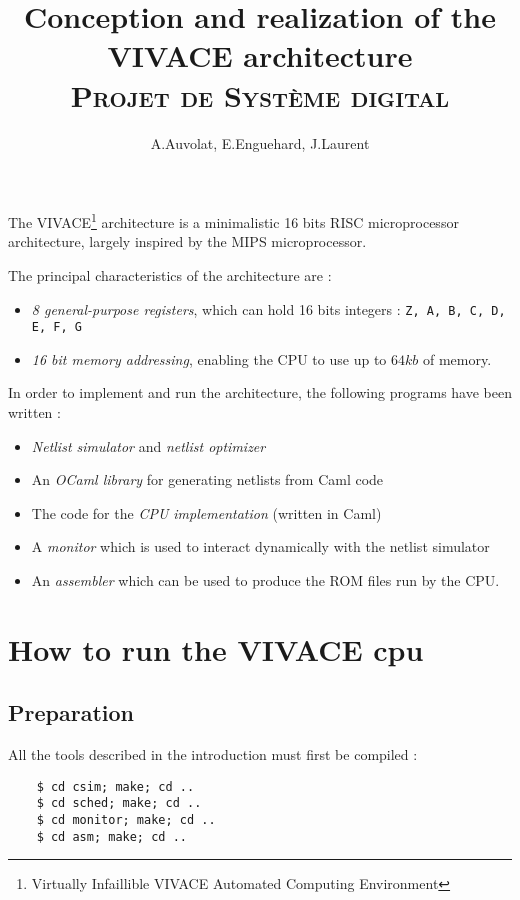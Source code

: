 \documentclass[11pt, a4paper]{article}
\newcommand{\prog}[1]{{\tt#1}}
\begin{document}
\title{Conception and realization of the VIVACE architecture
             \\ \normalsize{\textsc{Projet de Système digital}}}
\author{A.Auvolat, E.Enguehard, J.Laurent}
\maketitle


The VIVACE\footnote{Virtually Infaillible VIVACE Automated Computing Environment} architecture is
a minimalistic 16 bits RISC microprocessor architecture, largely inspired by the MIPS
microprocessor.


The principal characteristics of the architecture are :

\begin{itemize}
\item \textit{8 general-purpose registers}, which can hold 16 bits integers : \prog{Z, A, B, C, D, E, F, G}
\item \textit{16 bit memory addressing}, enabling the CPU to use up to $64kb$ of memory.
\end{itemize}

In order to implement and run the architecture, the following programs have been written :

\begin{itemize}
\item \textit{Netlist  simulator} and \textit{netlist optimizer}
\item An \textit{OCaml library} for generating netlists from Caml code
\item The code for the \textit{CPU implementation} (written in Caml)
\item A \textit{monitor} which is used to interact dynamically with the netlist simulator
\item An \textit{assembler} which can be used to produce the ROM files run by the CPU.
\end{itemize}

\section{How to run the VIVACE cpu}
\subsection{Preparation}

All the tools described in the introduction must first be compiled :

\begin{verbatim}
    $ cd csim; make; cd .. 
    $ cd sched; make; cd .. 
    $ cd monitor; make; cd ..
    $ cd asm; make; cd ..
\end{verbatim}
\end{document}
